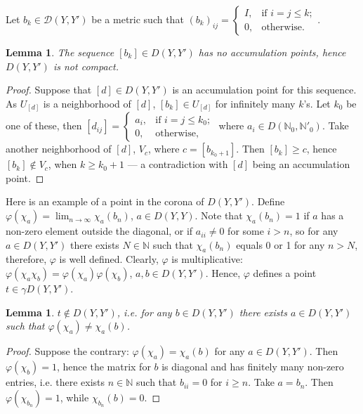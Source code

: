 \documentclass[12pt]{amsart}
\newtheorem{lem}[thm]{Lemma}
\theoremstyle{definition}
\begin{document}
Let $b_k\in\mathcal D(Y,Y')$ be a metric such that $(b_k)_{ij}=\left\lbrace\begin{array}{cl}I,&\mbox{if\ }i=j\leq k;\\0,&\mbox{otherwise.}\end{array}\right.$. 

\begin{lem}
The sequence $[b_k]\in D(Y,Y')$ has no accumulation points, hence $D(Y,Y')$ is not compact.

\end{lem}
\begin{proof}
Suppose that $[d]\in D(Y,Y')$ is an accumulation point for this sequence. As $U_{[d]}$ is a neighborhood of $[d]$, $[b_k]\in U_{[d]}$ for infinitely many $k$'s. Let $k_0$ be one of these, then $[d_{ij}]=\left\lbrace\begin{array}{cl}a_i,&\mbox{if\ }i=j\leq k_0;\\0,&\mbox{otherwise,}\end{array}\right.$ where $a_i\in D(\mathbb N_0,\mathbb N'_0)$. Take another neighborhood of $[d]$, $V_c$, where $c=[b_{k_0+1}]$. Then $[b_k]\geq c$, hence $[b_k]\notin V_c$, when $k\geq k_0+1$ --- a contradiction with $[d]$ being an accumulation point.  
\end{proof}

Here is an example of a point in the corona of $D(Y,Y')$. Define $\varphi(\chi_a)=\lim_{n\to\infty}\chi_a(b_n)$, $a\in D(Y,Y)$. Note that $\chi_a(b_n)=1$ if $a$ has a non-zero element outside the diagonal, or if $a_{ii}\neq 0$ for some $i>n$, so for any $a\in D(Y,Y')$ there exists $N\in\mathbb N$ such that $\chi_a(b_n)$ equals 0 or 1 for any $n>N$, therefore, $\varphi$ is well defined. Clearly, $\varphi$ is multiplicative: $\varphi(\chi_a\chi_b)=\varphi(\chi_a)\varphi(\chi_b)$, $a,b\in D(Y,Y')$. Hence, $\varphi$ defines a point $t\in \gamma D(Y,Y')$.

\begin{lem}
$t\notin D(Y,Y')$, i.e. for any $b\in D(Y,Y')$ there exists $a\in D(Y,Y')$ such that $\varphi(\chi_a)\neq\chi_a(b)$.

\end{lem}
\begin{proof}
Suppose the contrary: $\varphi(\chi_a)=\chi_a(b)$ for any $a\in D(Y,Y')$. Then $\varphi(\chi_b)=1$, hence the matrix for $b$ is diagonal and has finitely many non-zero entries, i.e. there exists $n\in\mathbb N$ such that $b_{ii}=0$ for $i\geq n$. Take $a=b_n$. Then $\varphi(\chi_{b_n})=1$, while $\chi_{b_n}(b)=0$.  
\end{proof} 
\end{document}
